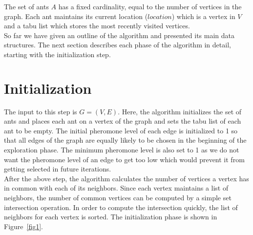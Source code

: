 \begin{spacing}{1.5}
\indent The set of ants $A$ has a fixed cardinality, equal to the number of vertices in the graph. Each ant maintains its current location ($location$) which is a vertex in $V$ and a tabu list which stores the most recently visited vertices.\\
\indent So far we have given an outline of the algorithm and presented its main data structures. The next section describes each phase of the algorithm in detail, starting with the initialization step.
\section{Initialization}
The input to this step is $G=(V, E)$. Here, the algorithm initializes the set of ants and places each ant on a vertex of the graph and sets the tabu list of each ant to be empty. The initial pheromone level of each edge is initialized to 1 so that all edges of the graph are equally likely to be chosen in the beginning of the exploration phase. The minimum pheromone level is also set to 1 as we do not want the pheromone level of an edge to get too low which would prevent it from getting selected in future iterations.\\
\indent After the above step, the algorithm calculates the number of vertices a vertex has in common with each of its neighbors. Since each vertex maintains a list of neighbors, the number of common vertices can be computed by a simple set intersection operation. In order to compute the intersection quickly, the list of neighbors for each vertex is sorted. The initialization phase is shown in Figure~\ref{fig1}.

\end{spacing}
